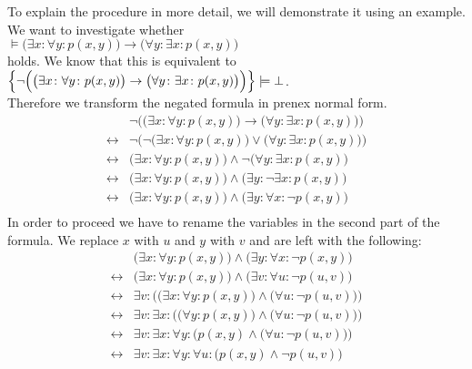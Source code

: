 To explain the procedure in more detail, we will demonstrate it using an example. 
We want to investigate whether 
\\[0.2cm]
\hspace*{1.3cm} 
$\models \big(\exists x\colon \forall y\colon  p(x,y)\big) \rightarrow \big(\forall y\colon \exists x\colon p(x,y)\big)$ \\[0.2cm]
holds. We know that this is equivalent to  \\[0.2cm]
\hspace*{1.3cm} 
$\Big\{ \neg \Big(\big(\exists x\colon \forall y\colon  p(x,y)\big) \rightarrow  \big(\forall y\colon \exists
x\colon p(x,y)\big)\Big)\Big\} \models \bot$.
\\[0.2cm]
Therefore we transform the negated formula in prenex normal form.
$$
\begin{array}{ll}
                  & \neg \Big(\big(\exists x\colon \forall y\colon  p(x,y)\big) \rightarrow \big(\forall y\colon \exists x\colon p(x,y)\big)\Big) \\
  \leftrightarrow & \neg \Big(\neg \big(\exists x\colon \forall y\colon  p(x,y)\big) \vee \big(\forall y\colon \exists x\colon p(x,y)\big)\Big) \\
  \leftrightarrow &                \big(\exists x\colon \forall y\colon  p(x,y)\big) \wedge \neg \big(\forall y\colon \exists x\colon p(x,y)\big) \\
  \leftrightarrow &\big(\exists x\colon \forall y\colon  p(x,y)\big) \wedge  \big(\exists y\colon  \neg \exists x\colon p(x,y)\big) \\
  \leftrightarrow &\big(\exists x\colon \forall y\colon  p(x,y)\big) \wedge  \big(\exists y\colon  \forall x\colon \neg p(x,y)\big) \\
\end{array}
$$
In order to proceed we have to rename the variables in the second part of the formula.
We replace $x$ with $u$ and $y$ with $v$ and are left with the following:
$$
\begin{array}{ll}
                  &\big(\exists x\colon \forall y\colon  p(x,y)\big) \wedge  \big(\exists y\colon  \forall x\colon \neg p(x,y)\big) \\
  \leftrightarrow &\big(\exists x\colon \forall y\colon  p(x,y)\big) \wedge  \big(\exists v\colon  \forall u\colon \neg p(u,v)\big) \\
  \leftrightarrow &\exists v\colon  \Big( \big(\exists x\colon \forall y\colon  p(x,y)\big) \wedge  \big(\forall u\colon \neg p(u,v)\big) \Big)\\
  \leftrightarrow &\exists v\colon  \exists x\colon  \Big( \big(\forall y\colon  p(x,y)\big) \wedge \big(\forall u\colon \neg p(u,v)\big) \Big)\\
  \leftrightarrow &\exists v\colon  \exists x\colon \forall y\colon \Big( p(x,y) \wedge \big(\forall u\colon \neg p(u,v)\big) \Big)\\
  \leftrightarrow &\exists v\colon  \exists x\colon \forall y\colon \forall u\colon \Big( p(x,y) \wedge \neg p(u,v) \Big)\\
\end{array}
$$
